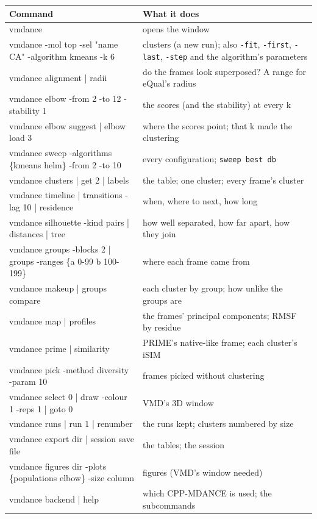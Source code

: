 \documentclass[11pt,letterpaper]{article}
\newcommand{\cmd}[1]{\texttt{#1}}
\begin{document}
\begin{center}
\small
\begin{tabularx}{\textwidth}{@{}T{0.52\textwidth}L@{}}
\toprule
\normalfont\textbf{Command} & \textbf{What it does} \\
\midrule
vmdance & opens the window \\
vmdance -mol top -sel "name CA" -algorithm kmeans -k 6 & clusters (a new run); also \cmd{-fit}, \cmd{-first}, \cmd{-last}, \cmd{-step} and the algorithm's parameters \\
vmdance alignment | radii & do the frames look superposed? A range for eQual's radius \\
vmdance elbow -from 2 -to 12 -stability 1 & the scores (and the stability) at every k \\
vmdance elbow suggest | elbow load 3 & where the scores point; that k made the clustering \\
vmdance sweep -algorithms \{kmeans helm\} -from 2 -to 10 & every configuration; \cmd{sweep best db} \\
vmdance clusters | get 2 | labels & the table; one cluster; every frame's cluster \\
vmdance timeline | transitions -lag 10 | residence & when, where to next, how long \\
vmdance silhouette -kind pairs | distances | tree & how well separated, how far apart, how they join \\
vmdance groups -blocks 2 | groups -ranges \{a 0-99 b 100-199\} & where each frame came from \\
vmdance makeup | groups compare & each cluster by group; how unlike the groups are \\
vmdance map | profiles & the frames' principal components; RMSF by residue \\
vmdance prime | similarity & PRIME's native-like frame; each cluster's iSIM \\
vmdance pick -method diversity -param 10 & frames picked without clustering \\
vmdance select 0 | draw -colour 1 -reps 1 | goto 0 & VMD's 3D window \\
vmdance runs | run 1 | renumber & the runs kept; clusters numbered by size \\
vmdance export dir | session save file & the tables; the session \\
vmdance figures dir -plots \{populations elbow\} -size column & figures (VMD's window needed) \\
vmdance backend | help & which CPP-MDANCE is used; the subcommands \\
\bottomrule
\end{tabularx}
\end{center}
\end{document}
